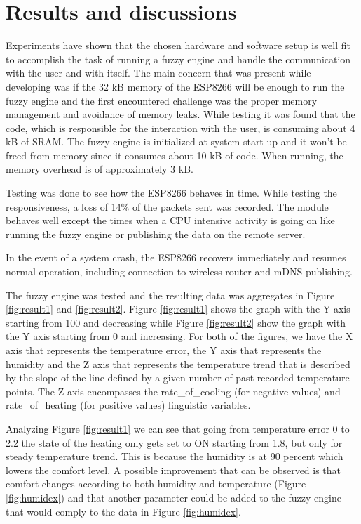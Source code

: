 \section{Results and discussions}
\label{Results and discussions}

Experiments have shown that the chosen hardware and software setup is well fit to accomplish the task of
running a fuzzy engine and handle the communication with the user and with itself.
The main concern that was present while developing was if the 32 kB memory of the ESP8266 will be enough to run
the fuzzy engine and the first encountered challenge was the proper memory management and avoidance of memory leaks.
While testing it was found that the  code, which is responsible for the interaction with
the user, is consuming about 4 kB of SRAM.
The fuzzy engine is initialized at system start-up and it won't be freed from memory since it consumes about 10 kB of code. When running, the memory overhead is of approximately 3 kB.

Testing was done to see how the ESP8266 behaves in time. While testing the responsiveness, a
loss of 14\% of the packets sent was recorded. The module behaves well except the times when a CPU intensive activity is going on like running the fuzzy engine or publishing the data on the remote server.

In the event of a system crash, the ESP8266 recovers immediately and resumes normal operation, including connection
to wireless router and mDNS publishing.

The fuzzy engine was tested and the resulting data was aggregates in Figure \ref{fig:result1} and
\ref{fig:result2}. Figure \ref{fig:result1} shows the graph with the Y axis starting from 100 and decreasing
while Figure \ref{fig:result2} show the graph with the Y axis starting from 0 and increasing.
For both of the figures, we have the X axis that represents the temperature error, the Y axis that represents
the humidity and the Z axis that represents the temperature trend that is described by the slope of the
line defined by a given number of past recorded temperature points. The Z axis encompasses the
rate\_of\_cooling (for negative values) and rate\_of\_heating (for positive values) linguistic variables.

Analyzing Figure \ref{fig:result1} we can see that going from temperature error 0 to 2.2
the state of the heating only gets set to ON starting from 1.8, but only for steady temperature trend. This is
because the humidity is at 90 percent which lowers the comfort level. A possible improvement that can be
observed is that comfort changes according to both humidity and temperature (Figure \ref{fig:humidex}) and
that another parameter could be added to the fuzzy engine that would comply to the data in Figure
\ref{fig:humidex}.

